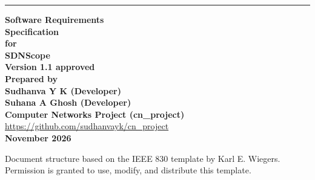 \documentclass[11pt,a4paper]{article}
\begin{document}
\begin{titlepage}
\vspace*{1.5cm}
\noindent\rule{\textwidth}{1.5pt}
\vspace{0.8cm}

\begin{flushright}
{\fontsize{26}{32}\selectfont\textbf{Software Requirements}}\\[6pt]
{\fontsize{26}{32}\selectfont\textbf{Specification}}\\[16pt]
{\fontsize{16}{20}\selectfont\textbf{for}}\\[16pt]
{\fontsize{26}{32}\selectfont\textbf{SDNScope}}\\[22pt]
{\fontsize{13}{16}\selectfont\textbf{Version 1.1 approved}}\\[32pt]
{\fontsize{13}{16}\selectfont\textbf{Prepared by}}\\[4pt]
{\fontsize{13}{16}\selectfont\textbf{Sudhanva Y K (Developer)}}\\[2pt]
{\fontsize{13}{16}\selectfont\textbf{Suhana A Ghosh (Developer)}}\\[20pt]
{\fontsize{13}{16}\selectfont\textbf{Computer Networks Project (cn\_project)}}\\[8pt]
{\fontsize{12}{15}\selectfont\url{https://github.com/sudhanvayk/cn_project}}\\[20pt]
{\fontsize{13}{16}\selectfont\textbf{November 2026}}
\end{flushright}

\vfill
\begin{center}
{\footnotesize Document structure based on the IEEE 830 template by Karl E. Wiegers.\\
Permission is granted to use, modify, and distribute this template.}
\end{center}
\end{titlepage}
\setcounter{page}{2}

{\setlength{\parskip}{2pt}
\tableofcontents
}
\thispagestyle{fancy}

\vspace{10pt}
\end{document}
